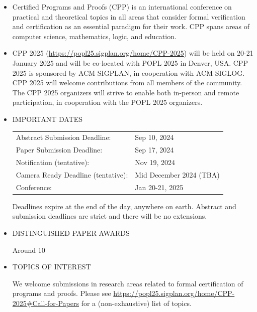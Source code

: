 \documentclass[prodmode,acmtecs]{acmsmall} %
\begin{document}
\begin{itemize}\item  Certified Programs and Proofs (CPP) is an international conference on practical and theoretical topics in all areas that consider formal verification and certification as an essential paradigm for their work. CPP spans areas of computer science, mathematics, logic, and education. 
 
\item  CPP 2025 (\href{https://popl25.sigplan.org/home/CPP-2025}{https://popl25.sigplan.org/home/CPP-2025}) will be held on 20-21 January 2025 and will be co-located with POPL 2025 in Denver, USA. CPP 2025 is sponsored by ACM SIGPLAN, in cooperation with ACM SIGLOG. CPP 2025 will welcome contributions from all members of the community. The CPP 2025 organizers will strive to enable both in-person and remote participation, in cooperation with the POPL 2025 organizers. 
 
\item  IMPORTANT DATES  
 
\begin{tabulary}{\linewidth}{LL}Abstract Submission Deadline:  & Sep 10, 2024 \\
Paper Submission Deadline:  & Sep 17, 2024 \\
Notification (tentative):  & Nov 19, 2024 \\
Camera Ready Deadline (tentative):  & Mid December 2024 (TBA) \\
Conference:  & Jan 20-21, 2025 \\
\end{tabulary}
 
  Deadlines expire at the end of the day, anywhere on earth. Abstract and submission deadlines are strict and there will be no extensions. 
 
\item  DISTINGUISHED PAPER AWARDS  
 
  Around 10%
 
\item  TOPICS OF INTEREST   
 
  We welcome submissions in research areas related to formal certification of programs and proofs. Please see \href{https://popl25.sigplan.org/home/CPP-2025#Call-for-Papers}{https://popl25.sigplan.org/home/CPP-2025\#Call-for-Papers} for a (non-exhaustive) list of topics.  
 

\end{itemize}
\end{document}
